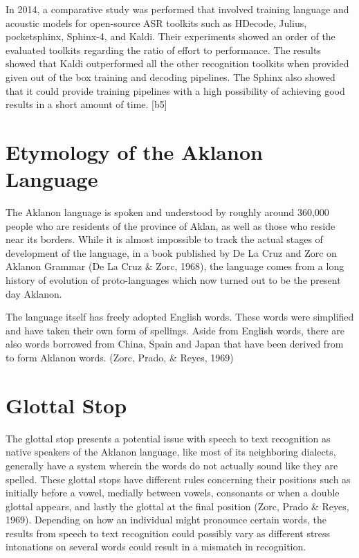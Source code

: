 In 2014, a comparative study was performed that involved training language and acoustic models for open-source ASR toolkits such as HDecode, Julius, pocketsphinx, Sphinx-4, and Kaldi. Their experiments showed an order of the evaluated toolkits regarding the ratio of effort to performance. The results showed that Kaldi outperformed all the other recognition toolkits when provided given out of the box training and decoding pipelines. The Sphinx also showed that it could provide training pipelines with a high possibility of achieving good results in a short amount of time.  [b5]

\section{Etymology of the Aklanon Language}

The Aklanon language is spoken and understood by roughly around 360,000 people who are residents of the province of Aklan, as well as those who reside near its borders. While it is almost impossible to track the actual stages of development of the language, in a book published by De La Cruz and Zorc on Aklanon Grammar (De La Cruz \& Zorc, 1968), the language comes from a long history of evolution of proto-languages which now turned out to be the present day Aklanon. 

The language itself has freely adopted English words. These words were simplified and have taken their own form of spellings. Aside from English words, there are also words borrowed from China, Spain and Japan that have been derived from to form Aklanon words. (Zorc, Prado, \& Reyes, 1969)

\section{Glottal Stop}

The glottal stop presents a potential issue with speech to text recognition as native speakers of the Aklanon language, like most of its neighboring dialects, generally have a system wherein the words do not actually sound like they are spelled. These glottal stops have different rules concerning their positions such as initially before a vowel, medially between vowels, consonants or when a double glottal appears, and lastly the glottal at the final position (Zorc, Prado \& Reyes, 1969). Depending on how an individual might pronounce certain words, the results from speech to text recognition could possibly vary as different stress intonations on several words could result in a mismatch in recognition.

